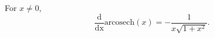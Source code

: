 For $x \ne 0$, \[ \frac{\mathrm{d}}{\mathrm{dx}} \mathrm{arcosech}(x)
= - \frac{1}{x \sqrt{1 + x^2}} . \]